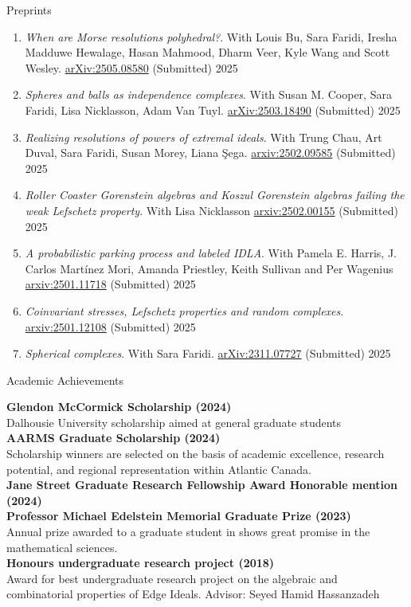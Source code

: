\documentclass[12pt]{resume} %
\begin{document}
\begin{rSection}{Preprints}

\begin{enumerate}
    \item \textit{When are Morse resolutions polyhedral?}.  With Louis Bu, Sara Faridi, Iresha Madduwe Hewalage, Hasan Mahmood, Dharm Veer, Kyle Wang and Scott Wesley. \href{https://arxiv.org/abs/2505.08580}{arXiv:2505.08580} (Submitted) 2025 
    \item \textit{Spheres and balls as independence complexes}. With Susan M. Cooper, Sara Faridi, Lisa Nicklasson, Adam Van Tuyl. \href{https://arxiv.org/abs/2503.18490}{arXiv:2503.18490} (Submitted) 2025
    \item \textit{Realizing resolutions of powers of extremal ideals}. With Trung Chau, Art Duval, Sara Faridi, Susan Morey, Liana \c{S}ega. \href{https://arxiv.org/abs/2502.09585}{arxiv:2502.09585} (Submitted) 2025
    \item \textit{Roller Coaster Gorenstein algebras and Koszul Gorenstein algebras failing the weak Lefschetz property}. With Lisa Nicklasson  \href{https://arxiv.org/abs/2502.00155}{arxiv:2502.00155} (Submitted) 2025
    \item \textit{A probabilistic parking process and labeled IDLA}. With Pamela E. Harris, J. Carlos Martínez Mori, Amanda Priestley, Keith Sullivan and Per Wagenius  \href{https://arxiv.org/abs/2501.11718}{arxiv:2501.11718} (Submitted) 2025
    \item \textit{Coinvariant stresses, Lefschetz properties and random complexes}. \href{https://arxiv.org/abs/2501.12108}{arxiv:2501.12108} (Submitted) 2025
    \item \textit{Spherical complexes}. With Sara Faridi. \href{https://arxiv.org/abs/2311.07727}{arXiv:2311.07727} (Submitted) 2025
\end{enumerate}
\end{rSection}

\newpage

\begin{rSection}{Academic Achievements}

{\bf Glendon McCormick Scholarship (2024)}
\\
Dalhousie University scholarship aimed at general graduate students
\\[1mm]
{\bf AARMS Graduate Scholarship (2024)}
\\
Scholarship winners are selected on the basis of academic excellence, research potential, and regional representation within Atlantic Canada.
\\[1mm]
{\bf Jane Street Graduate Research Fellowship Award Honorable mention (2024)}
\\[1mm]
{\bf Professor Michael Edelstein Memorial Graduate Prize (2023)}
\\
Annual prize awarded to a graduate student in shows great promise in the mathematical sciences. 
\\[1mm]
{\bf Honours undergraduate research project (2018)}
\\
Award for best undergraduate research project on the algebraic and combinatorial properties of Edge Ideals.
Advisor: Seyed Hamid Hassanzadeh
\end{rSection}
\end{document}
